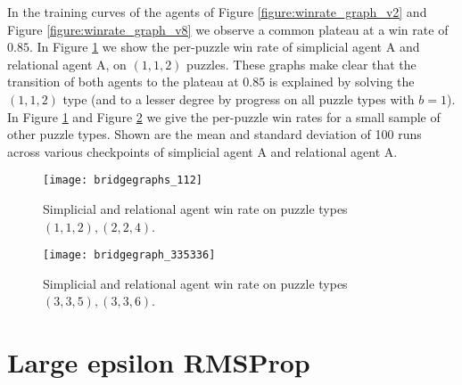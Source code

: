 \documentclass{article} %
\begin{document}
In the training curves of the agents of Figure \ref{figure:winrate_graph_v2} and Figure \ref{figure:winrate_graph_v8} we observe a common plateau at a win rate of $0.85$. In Figure \ref{figure:bridegraphs_112} we show the per-puzzle win rate of simplicial agent A and relational agent A, on $(1,1,2)$ puzzles. These graphs make clear that the transition of both agents to the plateau at $0.85$ is explained by solving the $(1,1,2)$ type (and to a lesser degree by progress on all puzzle types with $b = 1$). In Figure \ref{figure:bridegraphs_112} and Figure \ref{figure:bridegraph_334335336} we give the per-puzzle win rates for a small sample of other puzzle types. Shown are the mean and standard deviation of 100 runs across various checkpoints of simplicial agent A and relational agent A.
\begin{figure}[h]
\begin{center}
\texttt{[image: bridgegraphs\_112]}
\end{center}
\caption{Simplicial and relational agent win rate on puzzle types $(1,1,2),(2,2,4)$.}
\label{figure:bridegraphs_112}
\end{figure}


\begin{figure}[h]
\begin{center}
\texttt{[image: bridgegraph\_335336]}
\end{center}
\caption{Simplicial and relational agent win rate on puzzle types $(3,3,5),(3,3,6)$.}
\label{figure:bridegraph_334335336}
\end{figure}



\section{Large epsilon RMSProp}\label{appendix:rmsprop}
\end{document}
